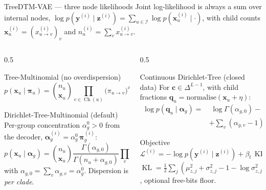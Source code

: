 \documentclass[aspectratio=169,11pt]{beamer}
\newcommand{\KL}{\operatorname{KL}}
\newcommand{\Inodes}{\mathcal I}
\newcommand{\Ch}{\operatorname{Ch}}
\begin{document}
\begin{frame}{TreeDTM-VAE --- three node likelihoods}
  Joint log-likelihood is always a sum over internal nodes,
  $\log p(\mathbf y^{(i)}\mid\mathbf z^{(i)})=\sum_{u\in\Inodes}\log p(\mathbf x^{(i)}_u\mid\cdot)$,
  with child counts $\mathbf x^{(i)}_u=(x^{(i)}_{u\to v})_{v}$ and
  $n^{(i)}_u=\sum_v x^{(i)}_{u\to v}$.
  \begin{columns}[T]
    \begin{column}{0.5\textwidth}
      \begin{block}{Tree-Multinomial (no overdispersion)}
        \footnotesize
        \[
          p(\mathbf x_u\mid\bm\pi_{u})=
          \binom{n_u}{\mathbf x_u}\prod_{v\in\Ch(u)}\big(\pi_{u\to v}\big)^{x_{u\to v}}
        \]
      \end{block}
      \begin{alertblock}{Dirichlet-Tree-Multinomial (default)}
        \footnotesize
        Per-group concentration $\alpha^0_g>0$ from the decoder, $\bm\alpha^{(i)}_g=\alpha^0_g\,\bm\pi^{(i)}_g$:
        \[
          p(\mathbf x_u\mid\bm\alpha_g)=
          \binom{n_u}{\mathbf x_u}
          \frac{\Gamma(\alpha_{g,0})}{\Gamma(n_u+\alpha_{g,0})}
          \prod_v\frac{\Gamma(x_{u\to v}+\alpha_{g,v})}{\Gamma(\alpha_{g,v})}
        \]
        with $\alpha_{g,0}=\sum_v\alpha_{g,v}=\alpha^0_g$. Dispersion is
        \emph{per clade}.
      \end{alertblock}
    \end{column}
    \begin{column}{0.5\textwidth}
      \begin{block}{Continuous Dirichlet-Tree (closed data)}
        \footnotesize
        For $\mathbf c\in\Delta^{L-1}$, with child fractions
        $\mathbf q_u=\mathrm{normalise}(\mathbf x_u+\eta)$:
        \[
        \begin{aligned}
          \log p(\mathbf q_u\mid\bm\alpha_g)=&\;
          \log\Gamma(\alpha_{g,0})-\sum_v\log\Gamma(\alpha_{g,v})\\
          &+\sum_v(\alpha_{g,v}-1)\log q_{u\to v}.
        \end{aligned}
        \]
      \end{block}
      \begin{block}{Objective}
        \footnotesize
        \[
          \mathcal L^{(i)}=-\log p(\mathbf y^{(i)}\mid\mathbf z^{(i)})
          +\beta_t\,\KL\!\big(q_\phi\,\|\,\mathcal N(\mathbf 0,I)\big)
          +\gamma\,\|\bm\alpha^0\|^2,
        \]
        $\KL=\tfrac12\sum_j(\mu_{z,j}^2+\sigma_{z,j}^2-1-\log\sigma_{z,j}^2)$, optional
        free-bits floor.
      \end{block}
    \end{column}
  \end{columns}
\end{frame}
\end{document}
